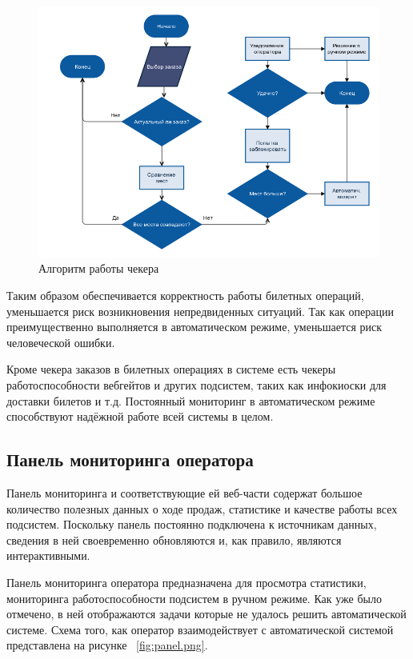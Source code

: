 \begin{figure}
  	\centering
 	\includegraphics[width=1\textwidth]{images/checker.png}
  	\caption{Алгоритм работы чекера}
    \label{fig:checker.png}
\end{figure}


Таким образом обеспечивается корректность работы билетных операций, уменьшается риск возникновения непредвиденных ситуаций. Так как операции преимущественно выполняется в автоматическом режиме, уменьшается риск человеческой ошибки. 


Кроме чекера заказов в билетных операциях в системе есть чекеры работоспособности вебгейтов и других подсистем, таких как инфокиоски для доставки билетов и т.д.
Постоянный мониторинг в автоматическом режиме способствуют надёжной работе всей системы в целом.


\subsection{Панель мониторинга оператора}


Панель мониторинга и соответствующие ей веб-части содержат большое количество полезных данных о ходе продаж, статистике и качестве работы всех подсистем. Поскольку панель  постоянно подключена к источникам данных, сведения в ней своевременно обновляются и, как правило, являются интерактивными.

Панель мониторинга оператора предназначена для просмотра статистики, мониторинга работоспособности подсистем в ручном режиме. Как уже было отмечено, в ней отображаются  задачи которые не удалось решить автоматической системе. Схема того, как оператор взаимодействует с автоматической системой представлена на рисунке ~\ref{fig:panel.png}.

